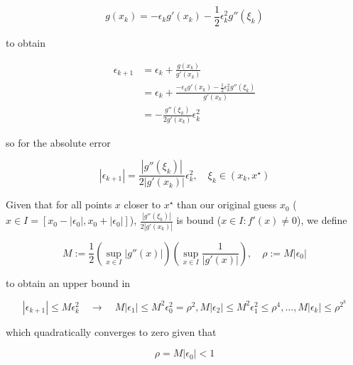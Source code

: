 \begin{equation}
    g(x_k) = -\epsilon_k g'(x_k) - \frac{1}{2} \epsilon_k^2 g''(\xi_k)
\end{equation}

to obtain

\begin{equation}
    \begin{aligned}
         \epsilon_{k+1} &= \epsilon_k + \frac{g\left(x_k\right)}{g'(x_k)} \\
                        &= \epsilon_k + \frac{-\epsilon_k g'(x_k) - \frac{1}{2} \epsilon_k^2 g''(\xi_k)}{g'(x_k)} \\
                        &= -\frac{g''(\xi_k)}{2 g'(x_k)} \epsilon_k^2
    \end{aligned}
\end{equation}

so for the absolute error

\begin{equation}
    \boxed{|\epsilon_{k+1}| = \frac{|g''(\xi_k)|}{2 |g'(x_k)|} \epsilon_k^2, \quad \xi_k \in (x_k,x^\star)}
\end{equation}

Given that for all points $x$ closer to $x^\star$ than our original
guess $x_0$ ($x \in I = [x_0 - |\epsilon_0|, x_0 + |\epsilon_0|]$), $\frac{|g''(\xi_k)|}{2 |g'(x_k)|}$ 
is bound ($x \in I: f'(x) \neq 0$), we define 

\begin{equation}
    M := \frac{1}{2} \left(\sup_{x \in I} |g''(x)|\right)  \left(\sup_{x \in I} \frac{1}{|g'(x)|}\right), \quad \rho := M |\epsilon_0|
\end{equation}

to obtain an upper bound in 

\begin{equation}
    |\epsilon_{k+1}| \leq M \epsilon_k^2 \quad \rightarrow \quad M |\epsilon_1| \leq M^2 \epsilon_0^2 = \rho^2, M |\epsilon_2| \leq M^2 \epsilon_1^2 \leq \rho^4,..., M |\epsilon_k| \leq \rho^{2^k}
\end{equation}

which quadratically converges to zero given that 

\begin{equation}
    \rho = M |\epsilon_0| < 1
\end{equation}



